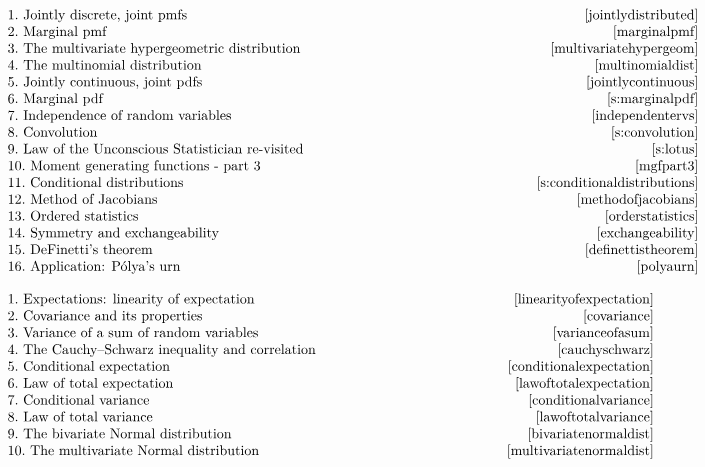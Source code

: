 \documentclass[12pt]{article}
\begin{document}
$
\begin{array}{lr}
1.\mbox{ Jointly discrete, joint pmfs}\ \, \hskip 3.25 in & \pageref{jointlydistributed} \\
2.\mbox{ Marginal pmf} & \pageref{marginalpmf}\\
3.\mbox{ The multivariate hypergeometric distribution} & \pageref{multivariatehypergeom}\\
4.\mbox{ The multinomial distribution} & \pageref{multinomialdist}\\
5.\mbox{ Jointly continuous, joint pdfs} & \pageref{jointlycontinuous}\\
6.\mbox{ Marginal pdf} & \pageref{s:marginalpdf}\\
7.\mbox{ Independence of random variables} & \pageref{independentervs}\\
8.\mbox{ Convolution} & \pageref{s:convolution}\\
9.\mbox{ Law of the Unconscious Statistician re-visited} & \pageref{s:lotus}\\
10.\mbox{ Moment generating functions - part 3} & \pageref{mgfpart3}\\
11.\mbox{ Conditional distributions} & \pageref{s:conditionaldistributions}\\
12.\mbox{ Method of Jacobians} & \pageref{methodofjacobians}\\
13.\mbox{ Ordered statistics} & \pageref{orderstatistics}\\
14.\mbox{ Symmetry and exchangeability} & \pageref{exchangeability}\\
15.\mbox{ DeFinetti's theorem} & \pageref{definettistheorem}\\
16.\mbox{ Application: P\'{o}lya's urn} & \pageref{polyaurn}\\
\end{array}$

\bigskip
{}

$
\begin{array}{lr}
1.\mbox{ Expectations: linearity of expectation} & \hskip 1.8225 in \pageref{linearityofexpectation}\\
2.\mbox{ Covariance and its properties} & \pageref{covariance}\\
3.\mbox{ Variance of a sum of random variables} & \pageref{varianceofasum}\\
4.\mbox{ The Cauchy--Schwarz inequality and correlation} & \pageref{cauchyschwarz}\\
5.\mbox{ Conditional expectation} & \pageref{conditionalexpectation}\\
6.\mbox{ Law of total expectation} & \pageref{lawoftotalexpectation}\\
7.\mbox{ Conditional variance} & \pageref{conditionalvariance}\\
8.\mbox{ Law of total variance} & \pageref{lawoftotalvariance}\\
9.\mbox{ The bivariate Normal distribution} & \pageref{bivariatenormaldist}\\
10.\mbox{ The multivariate Normal distribution} & \pageref{multivariatenormaldist}\\
\end{array}
$
\end{document}
